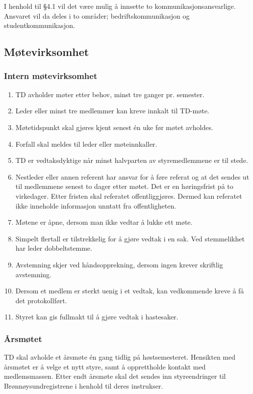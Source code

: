 \documentclass[11pt]{article}
\begin{document}
I henhold til §4.1 vil det være mulig å innsette to kommunikasjonsansvarlige. Ansvaret vil da deles i to områder; bedriftskommunikasjon og studentkommunikasjon.

\subsection{Møtevirksomhet}
\subsubsection{Intern møtevirksomhet}
\begin{enumerate}
	\item TD avholder møter etter behov, minst tre ganger pr. semester.
	\item Leder eller minst tre medlemmer kan kreve innkalt til TD-møte.
	\item Møtetidspunkt skal gjøres kjent senest én uke før møtet avholdes.
	\item Forfall skal meldes til leder eller møteinnkaller.
	\item TD er vedtaksdyktige når minst halvparten av styremedlemmene er til stede.
	\item Nestleder eller annen referent har ansvar for å føre referat og at det sendes ut til medlemmene senest to dager etter møtet. Det er en høringsfrist på to virkedager. Etter fristen skal referatet offentliggjøres. Dermed kan referatet ikke inneholde informasjon unntatt fra offentligheten.
	\item Møtene er åpne, dersom man ikke vedtar å lukke ett møte.
	\item Simpelt flertall er tilstrekkelig for å gjøre vedtak i en sak. Ved stemmelikhet har leder dobbeltstemme.
	\item Avstemning skjer ved håndsopprekning, dersom ingen krever skriftlig avstemning.
	\item Dersom et medlem er sterkt uenig i et vedtak, kan vedkommende kreve å få det protokollført.
	\item Styret kan gis fullmakt til å gjøre vedtak i hastesaker.
\end{enumerate}

\subsubsection{Årsmøtet}
TD skal avholde et årsmøte én gang tidlig på høstsemesteret. Hensikten med årsmøtet er å velge et nytt styre, samt å opprettholde kontakt med medlemsmassen. Etter endt årsmøte skal det sendes inn styreendringer til Brønnøysundregistrene i henhold til deres instrukser.
\end{document}
